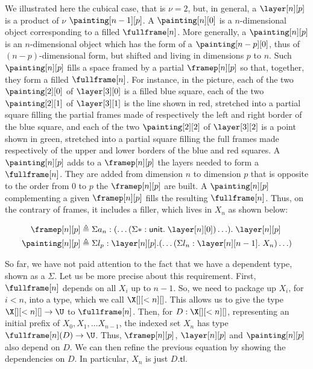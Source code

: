 \documentclass[10pt]{art.cls/art}
\newcommand{\unittype}{\ensuremath{\mathsf{unit}}}
\newcommand{\unitpoint}{\ensuremath{\ast}}
\newcommand{\defeq}{\ensuremath{\triangleq}}
\newcommand{\tl}{\ensuremath{\mathsf{tl}}}
\begin{document}
We illustrated here the cubical case, that is $\nu = 2$, but, in general, a $\layer[n][p]$ is a product of $\nu$ $\painting[n - 1][p]$. A $\painting[n][0]$ is a $n$-dimensional object corresponding to a filled $\fullframe[n]$. More generally, a $\painting[n][p]$ is an $n$-dimensional object which has the form of a $\painting[n-p][0]$, thus of $(n-p)$-dimensional form, but shifted and living in dimensions $p$ to $n$. Such $\painting[n][p]$ fills a space framed by a partial $\framep[n][p]$ so that, together, they form a filled $\fullframe[n]$. For instance, in the picture, each of the two $\painting[2][0]$ of $\layer[3][0]$ is a filled blue square, each of the two $\painting[2][1]$ of $\layer[3][1]$ is the line shown in red, stretched into a partial square filling the partial frames made of respectively the left and right border of the blue square, and each of the two $\painting[2][2]$ of $\layer[3][2]$ is a point shown in green, stretched into a partial square filling the full frames made respectively of the upper and lower borders of the blue and red squares. A $\painting[n][p]$ adds to a $\framep[n][p]$ the layers needed to form a $\fullframe[n]$. They are added from dimension $n$ to dimension $p$ that is opposite to the order from $0$ to $p$ the $\framep[n][p]$ are built. A $\painting[n][p]$ complementing a given $\framep[n][p]$ fills the resulting $\fullframe[n]$. Thus, on the contrary of frames, it includes a filler, which lives in $X_n$ as shown below:

\begin{align*}
  \framep[n][p]   & \defeq \Sigma a_n : (\ldots (\Sigma \unitpoint : \unittype .\; \layer[n][0]) \ldots) .\; \layer[n][p] \\
  \painting[n][p] & \defeq \Sigma l_p : \layer[n][p] . (\ldots (\Sigma l_n : \layer[n][n - 1] .\; X_n) \ldots)
\end{align*}

So far, we have not paid attention to the fact that we have a dependent type, shown as a $\Sigma$. Let us be more precise about this requirement. First, $\fullframe[n]$ depends on all $X_i$ up to $n - 1$. So, we need to package up $X_i$, for $i < n$, into a type, which we call $\X[][<n][]$. This allows us to give the type $\X[][<n][] \rightarrow \U$ to $\fullframe[n]$. Then, for $D: \X[][<n][]$, representing an initial prefix of $X_0, X_1, \ldots X_{n - 1}$, the indexed set $X_n$ has type $\fullframe[n](D) \rightarrow \U$. Thus, $\framep[n][p]$, $\layer[n][p]$ and $\painting[n][p]$ also depend on $D$. We can then refine the previous equation by showing the dependencies on $D$. In particular, $X_n$ is just $D.\tl$.
\end{document}

